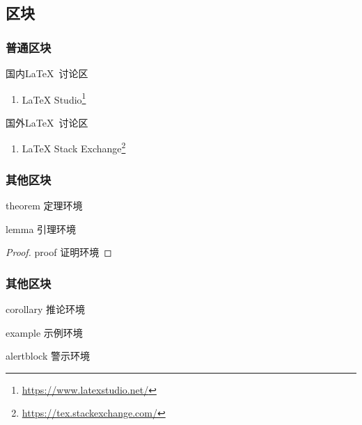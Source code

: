 \documentclass[AutoFakeBold,AutoFakeSlant]{beamer}
\begin{document}
\subsection{区块}

\begin{frame}
  \frametitle{普通区块}

  \begin{block}{国内\LaTeX\ 讨论区}
    \begin{enumerate}
      \item LaTeX Studio\footnote{\url{https://www.latexstudio.net/}}
    \end{enumerate}
  \end{block}

  \begin{block}{国外\LaTeX\ 讨论区}
    \begin{enumerate}
      \item LaTeX Stack Exchange\footnote{\url{https://tex.stackexchange.com/}}
    \end{enumerate}
  \end{block}
\end{frame}

\begin{frame}
  \frametitle{其他区块}

  \begin{theorem}{theorem 定理环境}

  \end{theorem}

  \begin{lemma}{lemma 引理环境}
    
  \end{lemma}

  \begin{proof}{proof 证明环境}
    
  \end{proof}
\end{frame}

\begin{frame}
  \frametitle{其他区块}

  \begin{corollary}{corollary 推论环境}
    
  \end{corollary}

  \begin{example}{example 示例环境}
    
  \end{example}

  \begin{alertblock}{alertblock 警示环境}

  \end{alertblock}
\end{frame}
\end{document}
